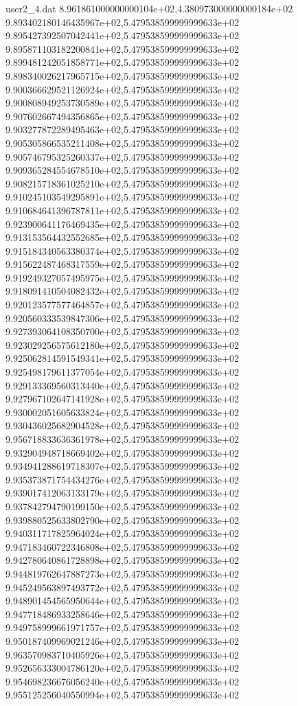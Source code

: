 \begin{filecontents}{user2_4.dat}
8.961861000000000104e+02,4.380973000000000184e+02
9.893402180146435967e+02,5.479538599999999633e+02
9.895427392507042441e+02,5.479538599999999633e+02
9.895871103182200841e+02,5.479538599999999633e+02
9.899481242051858771e+02,5.479538599999999633e+02
9.898340026217965715e+02,5.479538599999999633e+02
9.900366629521126924e+02,5.479538599999999633e+02
9.900808949253730589e+02,5.479538599999999633e+02
9.907602667494356865e+02,5.479538599999999633e+02
9.903277872289495463e+02,5.479538599999999633e+02
9.905305866535211408e+02,5.479538599999999633e+02
9.905746795325260337e+02,5.479538599999999633e+02
9.909365284554678510e+02,5.479538599999999633e+02
9.908215718361025210e+02,5.479538599999999633e+02
9.910245103549295891e+02,5.479538599999999633e+02
9.910684641396787811e+02,5.479538599999999633e+02
9.923900641176469435e+02,5.479538599999999633e+02
9.913153564432552685e+02,5.479538599999999633e+02
9.915184340563380374e+02,5.479538599999999633e+02
9.915622487468317559e+02,5.479538599999999633e+02
9.919249327057495975e+02,5.479538599999999633e+02
9.918091410504082432e+02,5.479538599999999633e+02
9.920123577577464857e+02,5.479538599999999633e+02
9.920560333539847306e+02,5.479538599999999633e+02
9.927393064108350700e+02,5.479538599999999633e+02
9.923029256575612180e+02,5.479538599999999633e+02
9.925062814591549341e+02,5.479538599999999633e+02
9.925498179611377054e+02,5.479538599999999633e+02
9.929133369560313440e+02,5.479538599999999633e+02
9.927967102647141928e+02,5.479538599999999633e+02
9.930002051605633824e+02,5.479538599999999633e+02
9.930436025682904528e+02,5.479538599999999633e+02
9.956718833636361978e+02,5.479538599999999633e+02
9.932904948718669402e+02,5.479538599999999633e+02
9.934941288619718307e+02,5.479538599999999633e+02
9.935373871754434276e+02,5.479538599999999633e+02
9.939017412063133179e+02,5.479538599999999633e+02
9.937842794790199150e+02,5.479538599999999633e+02
9.939880525633802790e+02,5.479538599999999633e+02
9.940311717825964024e+02,5.479538599999999633e+02
9.947183460722346808e+02,5.479538599999999633e+02
9.942780640861728898e+02,5.479538599999999633e+02
9.944819762647887273e+02,5.479538599999999633e+02
9.945249563897493772e+02,5.479538599999999633e+02
9.948901454565950644e+02,5.479538599999999633e+02
9.947718486933258646e+02,5.479538599999999633e+02
9.949758999661971757e+02,5.479538599999999633e+02
9.950187409969021246e+02,5.479538599999999633e+02
9.963570983710405926e+02,5.479538599999999633e+02
9.952656333004786120e+02,5.479538599999999633e+02
9.954698236676056240e+02,5.479538599999999633e+02
9.955125256040550994e+02,5.479538599999999633e+02

\end{filecontents}
